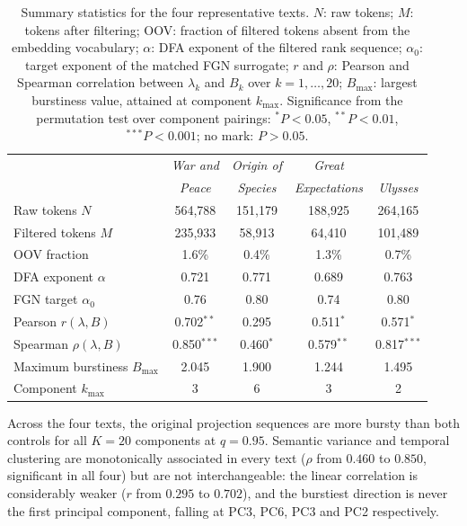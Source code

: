 \documentclass[preprint]{elsarticle}
\begin{document}
\begin{table}[tbp]
\centering
\caption{Summary statistics for the four representative texts.
$N$: raw tokens; $M$: tokens after filtering; OOV: fraction of filtered
tokens absent from the embedding vocabulary; $\alpha$: DFA exponent of the
filtered rank sequence; $\alpha_0$: target exponent of the matched FGN
surrogate; $r$ and $\rho$: Pearson and Spearman correlation between
$\lambda_k$ and $B_k$ over $k = 1,\ldots,20$; $B_{\max}$: largest
burstiness value, attained at component $k_{\max}$.
Significance from the permutation test over component pairings:
$^{*}P<0.05$, $^{**}P<0.01$, $^{***}P<0.001$; no mark: $P>0.05$.}
\label{tab:single_text_summary}
\small
\begin{tabular}{@{}l cccc@{}}
\toprule
 & \emph{War and} & \emph{Origin of} & \emph{Great} & \\
 & \emph{Peace}   & \emph{Species}   & \emph{Expectations} & \emph{Ulysses} \\
\midrule
Raw tokens $N$                & 564{,}788 & 151{,}179 & 188{,}925 & 264{,}165 \\
Filtered tokens $M$           & 235{,}933 &  58{,}913 &  64{,}410 & 101{,}489 \\
OOV fraction                  & 1.6\%     & 0.4\%     & 1.3\%     & 0.7\%     \\
DFA exponent $\alpha$         & 0.721     & 0.771     & 0.689     & 0.763     \\
FGN target $\alpha_0$         & 0.76      & 0.80      & 0.74      & 0.80      \\
Pearson $r(\lambda,B)$        & 0.702$^{**}$  & 0.295       & 0.511$^{*}$  & 0.571$^{*}$   \\
Spearman $\rho(\lambda,B)$    & 0.850$^{***}$ & 0.460$^{*}$ & 0.579$^{**}$ & 0.817$^{***}$ \\
Maximum burstiness $B_{\max}$ & 2.045     & 1.900     & 1.244     & 1.495     \\
Component $k_{\max}$          & 3         & 6         & 3         & 2         \\
\bottomrule
\end{tabular}


\end{table}



Across the four texts, the original projection sequences are more bursty
than both controls for all $K=20$ components at $q=0.95$. Semantic
variance and temporal clustering are monotonically associated in every
text ($\rho$ from $0.460$ to $0.850$, significant in all four) but are
not interchangeable: the linear correlation is considerably weaker
($r$ from $0.295$ to $0.702$), and the burstiest direction is never the
first principal component, falling at PC3, PC6, PC3 and PC2
respectively.
\end{document}
